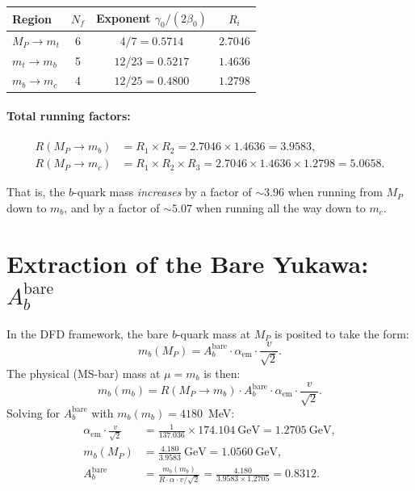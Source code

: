 \documentclass[11pt]{article}
\begin{document}
\begin{center}
\begin{tabular}{lccc}
\toprule
Region & $N_f$ & Exponent $\gamma_0/(2\beta_0)$ & $R_i$ \\
\midrule
$M_P \to m_t$ & 6 & $4/7 = 0.5714$ & $2.7046$ \\
$m_t \to m_b$ & 5 & $12/23 = 0.5217$ & $1.4636$ \\
$m_b \to m_c$ & 4 & $12/25 = 0.4800$ & $1.2798$ \\
\bottomrule
\end{tabular}
\end{center}

\paragraph{Total running factors:}
\begin{align}
R(M_P \to m_b) &= R_1 \times R_2 = 2.7046 \times 1.4636 = \boxed{3.9583}, \\
R(M_P \to m_c) &= R_1 \times R_2 \times R_3 = 2.7046 \times 1.4636 \times 1.2798 = \boxed{5.0658}.
\end{align}

That is, the $b$-quark mass \emph{increases} by a factor of $\sim 3.96$ when running from $M_P$ down to $m_b$, and by a factor of $\sim 5.07$ when running all the way down to $m_c$.

\section{Extraction of the Bare Yukawa: $A_b^{\mathrm{bare}}$}

In the DFD framework, the bare $b$-quark mass at $M_P$ is posited to take the form:
\begin{equation}
m_b(M_P) = A_b^{\mathrm{bare}} \cdot \alpha_{\mathrm{em}} \cdot \frac{v}{\sqrt{2}}.
\end{equation}
The physical (MS-bar) mass at $\mu = m_b$ is then:
\begin{equation}
m_b(m_b) = R(M_P \to m_b) \cdot A_b^{\mathrm{bare}} \cdot \alpha_{\mathrm{em}} \cdot \frac{v}{\sqrt{2}}.
\end{equation}
Solving for $A_b^{\mathrm{bare}}$ with $m_b(m_b) = 4180$~MeV:
\begin{align}
\alpha_{\mathrm{em}} \cdot \frac{v}{\sqrt{2}} &= \frac{1}{137.036} \times 174.104~\text{GeV} = 1.2705~\text{GeV}, \\[6pt]
m_b(M_P) &= \frac{4.180}{3.9583}~\text{GeV} = 1.0560~\text{GeV}, \\[6pt]
A_b^{\mathrm{bare}} &= \frac{m_b(m_b)}{R \cdot \alpha \cdot v/\sqrt{2}}
= \frac{4.180}{3.9583 \times 1.2705} = \boxed{0.8312}.
\end{align}
\end{document}
